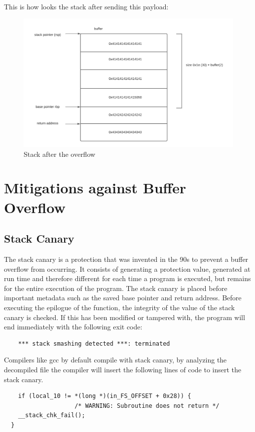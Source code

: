 \documentclass{report}
\begin{document}
    This is how looks the stack after sending this payload:
    \begin{figure}
        \centering
        \includegraphics[width=1\linewidth]{stack_after_overflow.png}
        \caption{Stack after the overflow}
        \label{fig:stack w overflow}
    \end{figure}
    \clearpage
    \section{Mitigations against Buffer Overflow}
    \subsection{Stack Canary}
    The stack canary is a protection that was invented in the 90s to prevent a buffer overflow from occurring.
    It consists of generating a protection value, generated at run time and therefore different for each time a program is executed, but remains for the entire execution of the program.
    The stack canary is placed before important metadata such as the saved base pointer and return address.
    Before executing the epilogue of the function, the integrity of the value of the stack canary is checked. If this has been modified or tampered with, the program will end immediately with the following exit code:
    \begin{verbatim}
    *** stack smashing detected ***: terminated
    \end{verbatim}
    Compilers like gcc by default compile with stack canary, by analyzing the decompiled file the compiler will insert the following lines of code to insert the stack canary.\newline
    \begin{verbatim}
    if (local_10 != *(long *)(in_FS_OFFSET + 0x28)) {
                    /* WARNING: Subroutine does not return */
    __stack_chk_fail();
  }
    \end{verbatim}
    
\end{document}
